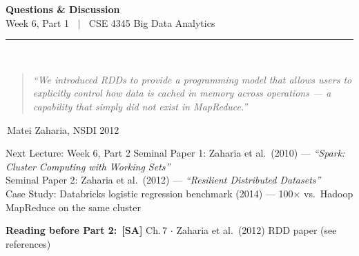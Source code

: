 \documentclass[aspectratio=169,10pt]{beamer}
\begin{document}
\begin{frame}[c]
  \begin{center}
    {\Large\bfseries Questions \& Discussion}\\[10pt]
    {\large Week 6, Part 1 $\;\mid\;$ CSE 4345 Big Data Analytics}\\[8pt]
    \textcolor{PUGray}{\rule{7cm}{0.5pt}}\\[10pt]
    \begin{quote}
      \itshape ``We introduced RDDs to provide a programming model that allows users to explicitly control how data is cached in memory across operations --- a capability that simply did not exist in MapReduce.''
    \end{quote}
    \hfill\textemdash\,Matei Zaharia, NSDI 2012
    \vspace{12pt}
    \begin{block}{\centering Next Lecture: Week 6, Part 2}
      \centering
      Seminal Paper 1: Zaharia et al.\ (2010) --- \textit{``Spark: Cluster Computing with Working Sets''}\\[4pt]
      Seminal Paper 2: Zaharia et al.\ (2012) --- \textit{``Resilient Distributed Datasets''}\\[4pt]
      \small Case Study: Databricks logistic regression benchmark (2014) ---
      100$\times$ vs.\ Hadoop MapReduce on the same cluster
    \end{block}
    \vspace{6pt}
    \textbf{Reading before Part 2:}\ \textbf{[SA]} Ch.\,7 $\cdot$ Zaharia et al.\ (2012) RDD paper (see references)
  \end{center}
\end{frame}

\end{document}
